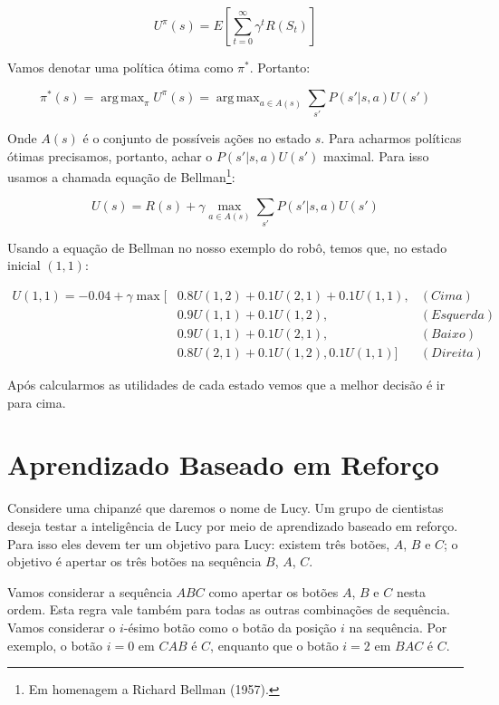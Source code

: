 \documentclass[a4paper,10pt]{article}
\DeclareMathOperator*{\argmax}{arg\,max}
\theoremstyle{plain}
\begin{document}
\begin{equation*}
  U^\pi(s) = E\left[\sum_{t=0}^\infty \gamma^t R(S_t)\right]
\end{equation*}

Vamos denotar uma política ótima como $\pi^*$. Portanto:

\begin{equation*}
  \pi^*(s) = \argmax_\pi U^\pi(s) = \argmax_{a \in A(s)} \sum_{s'} P(s'|s,a)U(s')
\end{equation*}

Onde $A(s)$ é o conjunto de possíveis ações no estado $s$. Para acharmos políticas ótimas
precisamos, portanto, achar o $P(s'|s,a)U(s')$ maximal. Para isso usamos a chamada equação de
Bellman\footnote{Em homenagem a Richard Bellman (1957).}:

\begin{equation*}
  U(s) = R(s) + \gamma \max_{a \in A(s)} \sum_{s'} P(s'|s,a)U(s')
\end{equation*}

Usando a equação de Bellman no nosso exemplo do robô, temos que, no estado inicial $(1, 1)$:

\begin{align*}
  U(1, 1) = -0.04 + \gamma \max[&0.8 U(1, 2) + 0.1 U(2, 1) + 0.1 U(1, 1), &(Cima) \\
                                &0.9 U(1, 1) + 0.1 U(1, 2), &(Esquerda) \\
                                &0.9 U(1, 1) + 0.1 U(2, 1), &(Baixo) \\
                                &0.8 U(2, 1) + 0.1 U(1, 2), 0.1U(1, 1)] &(Direita)
\end{align*}

Após calcularmos as utilidades de cada estado vemos que a melhor decisão é ir para cima.

\section{Aprendizado Baseado em Reforço}

Considere uma chipanzé que daremos o nome de Lucy. Um grupo de cientistas deseja testar a
inteligência de Lucy por meio de aprendizado baseado em reforço. Para isso eles devem ter um
objetivo para Lucy: existem três botões, $A$, $B$ e $C$; o objetivo é apertar os três botões na
sequência $B$, $A$, $C$.

Vamos considerar a sequência $ABC$ como apertar os botões $A$, $B$ e $C$ nesta ordem. Esta regra
vale também para todas as outras combinações de sequência. Vamos considerar o $i$-ésimo botão como
o botão da posição $i$ na sequência. Por exemplo, o botão $i=0$ em $CAB$ é $C$, enquanto que o
botão $i=2$ em $BAC$ é $C$.
\end{document}
